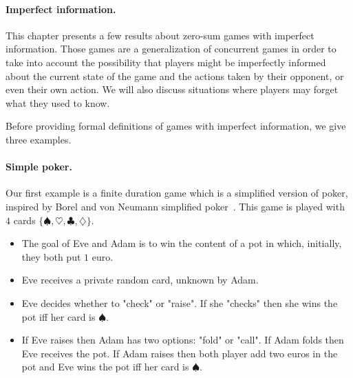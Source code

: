 \newcommand{\probimp}[3]{\mathbb{P}^{#1}_{#2}\left({#3}\right)}
\newcommand{\rand}{{\tt rand}}
\newcommand{\Isafe}{{\tt ISafe}}
\newcommand{\LL}{\mathcal{L}}
\newcommand{\KK}{\mathcal{K}}
\newcommand{\LLE}{\LL_{\text{Eve},=1}}
\newcommand{\LLA}{\LL_{\text{Adam},>0}}
\newcommand{\can}{\textsf{max}}
\newcommand{\be}{\begin{equation}}
\newcommand{\ee}{\end{equation}}

\newcommand{\targets}{TT}
\newcommand{\bh}{\setminus}
\newcommand{\signauxdeux}{T}
\newcommand{\actionsun}{A}


\paragraph{Imperfect information.}
This chapter presents a few results about zero-sum games with imperfect information.
Those games are a generalization of concurrent games in order to take into account the possibility that players might be imperfectly informed about the current state of the game
and the actions taken by their opponent, or even their own action. We will also discuss situations where players may forget what they used to know.

Before providing formal definitions of games with imperfect information,
we give three examples.

\newcommand{\ini}{\delta_0}

\paragraph{Simple poker.}

Our first example is a finite duration game which is a simplified version of poker,
inspired by Borel and von Neumann simplified poker~\cite{ferguson}.
This game is played with  $4$ cards $\{\spadesuit,\heartsuit,\clubsuit,\diamondsuit\}$.

\begin{itemize}
\item The goal of Eve and Adam is to win
the content of a pot in which, initially, they both put $1$ euro.
\item Eve receives a private random card, unknown by Adam.
\item Eve decides whether to "check" or "raise".
If she "checks" then she wins the pot iff her card is $\spadesuit$.
\item If Eve raises then Adam has two options: "fold"
or "call". If Adam folds then Eve receives the pot.
If Adam raises then both player add two euros in the pot
and Eve wins the pot iff her card is $\spadesuit$.
\end{itemize}

